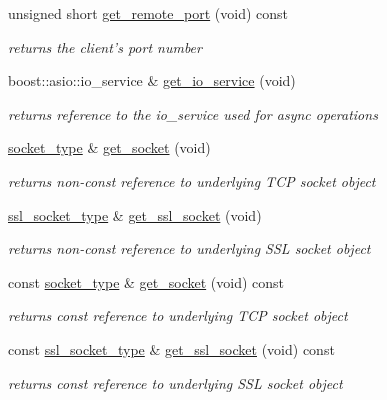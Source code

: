 \begin{DoxyCompactItemize}
unsigned short \hyperlink{classpion_1_1tcp_1_1connection_a735bcb8b1e2a9d04ad6d12e4f0c6f5a2}{get\-\_\-remote\-\_\-port} (void) const 
\begin{DoxyCompactList}\small\item\em returns the client's port number \end{DoxyCompactList}\item 
boost\-::asio\-::io\-\_\-service \& \hyperlink{classpion_1_1tcp_1_1connection_a6bbd6e925e3389cbee18915c9d63a47f}{get\-\_\-io\-\_\-service} (void)
\begin{DoxyCompactList}\small\item\em returns reference to the io\-\_\-service used for async operations \end{DoxyCompactList}\item 
\hyperlink{classpion_1_1tcp_1_1connection_a353c4d500505d51924d165c28b04641c}{socket\-\_\-type} \& \hyperlink{classpion_1_1tcp_1_1connection_a4a237acacf373637c95d2cbd24e42e74}{get\-\_\-socket} (void)
\begin{DoxyCompactList}\small\item\em returns non-\/const reference to underlying T\-C\-P socket object \end{DoxyCompactList}\item 
\hyperlink{classpion_1_1tcp_1_1connection_1_1ssl__socket__type}{ssl\-\_\-socket\-\_\-type} \& \hyperlink{classpion_1_1tcp_1_1connection_a0f3ba6ecd1f402e1e379db5440ecda94}{get\-\_\-ssl\-\_\-socket} (void)
\begin{DoxyCompactList}\small\item\em returns non-\/const reference to underlying S\-S\-L socket object \end{DoxyCompactList}\item 
const \hyperlink{classpion_1_1tcp_1_1connection_a353c4d500505d51924d165c28b04641c}{socket\-\_\-type} \& \hyperlink{classpion_1_1tcp_1_1connection_a16cef7660bcf80131d007351defe10a5}{get\-\_\-socket} (void) const 
\begin{DoxyCompactList}\small\item\em returns const reference to underlying T\-C\-P socket object \end{DoxyCompactList}\item 
const \hyperlink{classpion_1_1tcp_1_1connection_1_1ssl__socket__type}{ssl\-\_\-socket\-\_\-type} \& \hyperlink{classpion_1_1tcp_1_1connection_a8d3d2ec0d67d53b0a5d23ba3ca00dae8}{get\-\_\-ssl\-\_\-socket} (void) const 
\begin{DoxyCompactList}\small\item\em returns const reference to underlying S\-S\-L socket object \end{DoxyCompactList}\end{DoxyCompactItemize}

